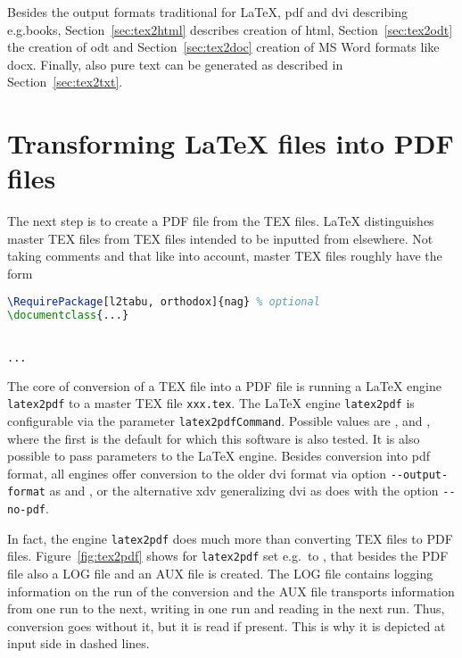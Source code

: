 Besides the output formats traditional for \LaTeX, 
\gls{pdf} and \gls{dvi} describing e.g.\@ books, 
Section~\ref{sec:tex2html} describes creation of 
\gls{html}, Section~\ref{sec:tex2odt} the creation of \gls{odt} and 
Section~\ref{sec:tex2doc} creation of MS Word formats like \gls{docx}. 
Finally, also pure text can be generated 
as described in Section~\ref{sec:tex2txt}. 

\newpage


\section{Transforming \LaTeX{} files into PDF files}\label{sec:tex2pdf}

The next step is to create a PDF file from the TEX files. 
\LaTeX{} distinguishes master TEX files from TEX files intended to be inputted
from elsewhere. 
Not taking comments and that like into account, 
master TEX files roughly have the form 
%
\begin{lstlisting}[language=tex, basicstyle=\small]
\RequirePackage[l2tabu, orthodox]{nag} % optional 
\documentclass{...}


...

\end{lstlisting}

The core of conversion of a TEX file into a PDF file 
is running a \LaTeX{} engine \texttt{latex2pdf} 
to a master TEX file \texttt{xxx.tex}.
The \LaTeX{} engine \texttt{latex2pdf} 
is configurable via the parameter \texttt{latex2pdfCommand}. 
Possible values are \lualatex{}, \xelatex{} and \pdflatex, 
where the first is the default for which this software is also tested. 
It is also possible to pass parameters to the \LaTeX{} engine. 
Besides conversion into \gls{pdf} format, 
all engines offer conversion to the older \gls{dvi} format 
via option \texttt{-{}-output-format} as \lualatex{} and \pdflatex, 
or the alternative \gls{xdv} generalizing \gls{dvi} 
as \xelatex{} does with the option \texttt{-{}-no-pdf}. 

In fact, the engine \texttt{latex2pdf} 
does much more than converting TEX files to PDF files. 
Figure~\ref{fig:tex2pdf} shows for \texttt{latex2pdf} set e.g.~to \lualatex{}, 
that besides the PDF file also a LOG file and an AUX file is created. 
The LOG file contains logging information on the run of the conversion 
and the AUX file transports information from one run to the next, 
writing in one run and reading in the next run. 
Thus, conversion goes without it, but it is read if present. 
This is why it is depicted at input side in dashed lines. 

